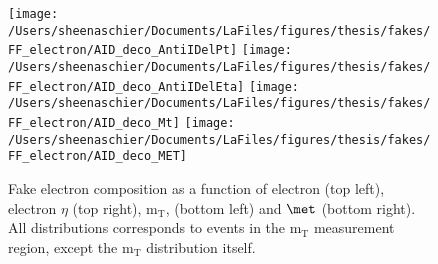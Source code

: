 \begin{figure}[htb]
        \centering
         \texttt{[image: /Users/sheenaschier/Documents/LaFiles/figures/thesis/fakes/FF\_electron/AID\_deco\_AntiIDelPt]}
        \texttt{[image: /Users/sheenaschier/Documents/LaFiles/figures/thesis/fakes/FF\_electron/AID\_deco\_AntiIDelEta]}
        \texttt{[image: /Users/sheenaschier/Documents/LaFiles/figures/thesis/fakes/FF\_electron/AID\_deco\_Mt]}
        \texttt{[image: /Users/sheenaschier/Documents/LaFiles/figures/thesis/fakes/FF\_electron/AID\_deco\_MET]}
        \caption{Fake electron composition as a function of electron \pt{} (top left), electron $\eta$ (top right), $\mathrm{m_T}$, (bottom left) and $\met$ (bottom right). All distributions corresponds to events in the $\mathrm{m_T}$ measurement region, except the $\mathrm{m_T}$ distribution itself. }
\label{fig:elDeco}
\end{figure}

